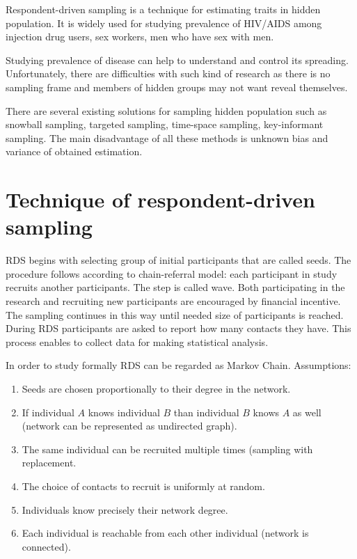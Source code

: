 \documentclass[12pt]{report}
\begin{document}
Respondent-driven sampling is a technique for estimating traits in hidden population. It is widely used for studying prevalence of HIV/AIDS among injection drug users, sex workers, men who have sex with men.  

Studying prevalence of disease can help to understand and control its spreading. Unfortunately, there are difficulties with such kind of research as there is no sampling frame and members of hidden groups may not want reveal themselves. 

There are several existing solutions for sampling hidden population such as snowball sampling, targeted sampling, time-space sampling, key-informant sampling. The main disadvantage of all these methods is unknown bias and variance of obtained estimation.


\section{Technique of respondent-driven sampling}
RDS begins with selecting group of initial participants that are called seeds. The procedure follows according to chain-referral model: each participant in study recruits another participants. The step is called wave. Both participating in the research and recruiting new participants are encouraged by financial incentive. The sampling continues in this way until needed size of participants is reached. During RDS participants are asked to report how many contacts they have.
This process enables to collect data for making statistical analysis.

In order to study formally RDS can be regarded as Markov Chain.
Assumptions:
\begin{enumerate}
  \item Seeds are chosen proportionally to their degree in the network.  
  \item If individual $A$ knows individual $B$ than individual $B$ knows $A$ as well (network can be represented as undirected graph).
  \item The same individual can be recruited multiple times (sampling with replacement.
  \item The choice of contacts to recruit is uniformly at random.
  \item Individuals know precisely their network degree. 
  \item Each individual is reachable from each other individual (network is connected). 
\end{enumerate}
\end{document}
